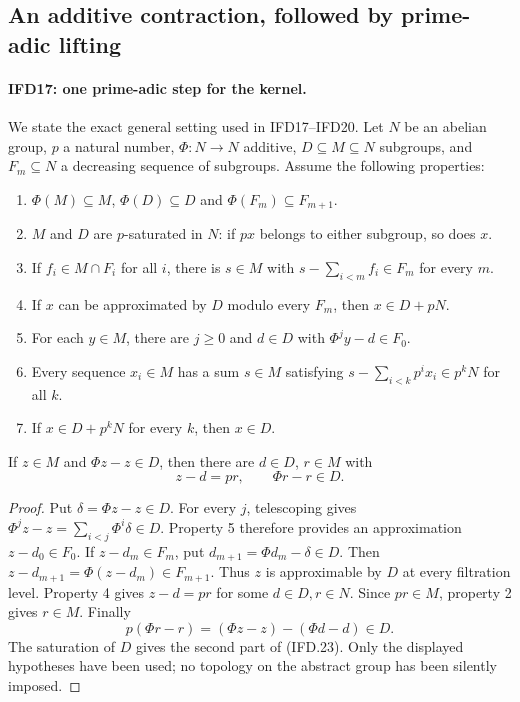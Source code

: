 \subsection{An additive contraction, followed by prime-adic lifting}

\paragraph{IFD17: one prime-adic step for the kernel.}
\label{claim:IFD17}
We state the exact general setting used in IFD17--IFD20.
Let $N$ be an abelian group, $p$ a natural number,
$\Phi:N\to N$ additive, $D\subseteq M\subseteq N$ subgroups,
and $F_m\subseteq N$ a decreasing sequence of subgroups.
Assume the following properties:
\begin{enumerate}
\item $\Phi(M)\subseteq M$, $\Phi(D)\subseteq D$ and
      $\Phi(F_m)\subseteq F_{m+1}$.
\item $M$ and $D$ are $p$-saturated in $N$: if $px$ belongs
      to either subgroup, so does $x$.
\item If $f_i\in M\cap F_i$ for all $i$, there is $s\in M$
      with $s-\sum_{i<m}f_i\in F_m$ for every $m$.
\item If $x$ can be approximated by $D$ modulo every $F_m$,
      then $x\in D+pN$.
\item For each $y\in M$, there are $j\geq0$ and $d\in D$
      with $\Phi^jy-d\in F_0$.
\item Every sequence $x_i\in M$ has a sum $s\in M$ satisfying
      $s-\sum_{i<k}p^ix_i\in p^kN$ for all $k$.
\item If $x\in D+p^kN$ for every $k$, then $x\in D$.
\end{enumerate}
If $z\in M$ and $\Phi z-z\in D$, then there are $d\in D$,
$r\in M$ with
\[
                         z-d=pr,\qquad \Phi r-r\in D.      \tag{IFD.23}
\]

\begin{proof}
Put $\delta=\Phi z-z\in D$.
For every $j$, telescoping gives
$\Phi^jz-z=\sum_{i<j}\Phi^i\delta\in D$.
Property 5 therefore provides an approximation $z-d_0\in F_0$.
If $z-d_m\in F_m$, put $d_{m+1}=\Phi d_m-\delta\in D$.
Then $z-d_{m+1}=\Phi(z-d_m)\in F_{m+1}$.
Thus $z$ is approximable by $D$ at every filtration level.
Property 4 gives $z-d=pr$ for some $d\in D,r\in N$.
Since $pr\in M$, property 2 gives $r\in M$.
Finally
\[
                p(\Phi r-r)=(\Phi z-z)-(\Phi d-d)\in D.
\]
The saturation of $D$ gives the second part of (IFD.23).
Only the displayed hypotheses have been used; no topology on the
abstract group has been silently imposed.
\end{proof}

